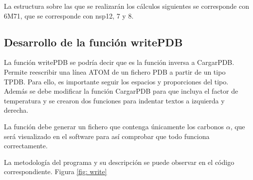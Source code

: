 \documentclass[a4paper,11pt]{report}
\begin{document}
La estructura sobre las que se realizarán los cálculos siguientes se corresponde con 6M71, que se corresponde con nsp12, 7 y 8.
 \subsection{Desarrollo de la función writePDB}
 La función writePDB se podría decir que es la función inversa a CargarPDB. Permite reescribir una línea ATOM de un fichero PDB a partir de un tipo TPDB. Para ello, es importante seguir los espacios y proporciones del tipo. Además se debe modificar la función CargarPDB para que incluya el factor de temperatura y se crearon dos funciones para indentar textos a izquierda y derecha.
 
La función debe generar un fichero que contenga únicamente los carbonos $\alpha$, que será visualizado en el software para así comprobar que todo funciona correctamente.

La metodología del programa y su descripción se puede observar en el código correspondiente. Figura \ref{fig: write}
\end{document}
